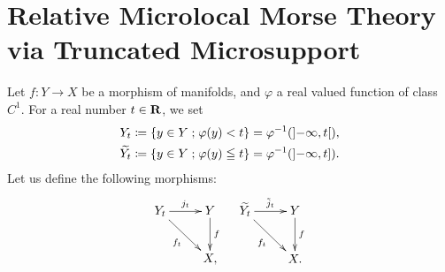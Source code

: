 \section{Relative Microlocal Morse Theory via Truncated Microsupport}

Let \(f\colon Y\to X\) be a morphism of manifolds, and 
\(\varphi\) a real valued function of class \(C^1\). 
For a real number \(t\in \mathbf{R}\), we set 
\begin{align*}
  Y_t
  &\coloneqq \left\{y\in Y\mathrel{;} \varphi(y)< t\right\} 
  = \varphi^{-1}(\mathopen{]}-\infty,t\mathclose{[}),\\
  \widetilde{Y_t}
  &\coloneqq \left\{y\in Y\mathrel{;} \varphi(y)\leqq t\right\} 
  = \varphi^{-1}(\mathopen{]}-\infty,t\mathopen{]}).
\end{align*}
Let us define the following morphisms:
\[\xymatrix{
  Y_t\ar[r]^-{j_t}
  \ar[rd]_-{f_t}
  &
  Y
  \ar[d]^-{f}\\
  &X,
}\quad\xymatrix{
  \widetilde{Y_t}\ar[r]^-{\tilde{j}_t}
  \ar[rd]_-{f_t}
  &
  Y
  \ar[d]^-{f}\\
  &X.
}\]

